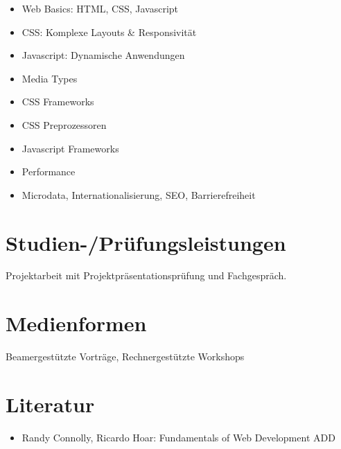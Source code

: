 \begin{itemize}
\tightlist
\item
  Web Basics: HTML, CSS, Javascript
\item
  CSS: Komplexe Layouts \& Responsivität
\item
  Javascript: Dynamische Anwendungen
\item
  Media Types
\item
  CSS Frameworks
\item
  CSS Preprozessoren
\item
  Javascript Frameworks
\item
  Performance
\item
  Microdata, Internationalisierung, SEO, Barrierefreiheit
\end{itemize}

\hypertarget{studien-pruxfcfungsleistungenpathlabelmi-2017modulbeschreibungen-bachelorba_wd_frontend-development}{%
\section*{Studien-/Prüfungsleistungen\label{/mi-2017/modulbeschreibungen-bachelor/BA_WD_Frontend-Development}}\label{studien-pruxfcfungsleistungenpathlabelmi-2017modulbeschreibungen-bachelorba_wd_frontend-development}}

Projektarbeit mit Projektpräsentationsprüfung und Fachgespräch.

\hypertarget{medienformenpathlabelmi-2017modulbeschreibungen-bachelorba_wd_frontend-development}{%
\section*{Medienformen\label{/mi-2017/modulbeschreibungen-bachelor/BA_WD_Frontend-Development}}\label{medienformenpathlabelmi-2017modulbeschreibungen-bachelorba_wd_frontend-development}}

Beamergestützte Vorträge, Rechnergestützte Workshops

\hypertarget{literaturpathlabelmi-2017modulbeschreibungen-bachelorba_wd_frontend-development}{%
\section*{Literatur\label{/mi-2017/modulbeschreibungen-bachelor/BA_WD_Frontend-Development}}\label{literaturpathlabelmi-2017modulbeschreibungen-bachelorba_wd_frontend-development}}

\begin{itemize}
\tightlist
\item
  Randy Connolly, Ricardo Hoar: Fundamentals of Web Development ADD
\end{itemize}

